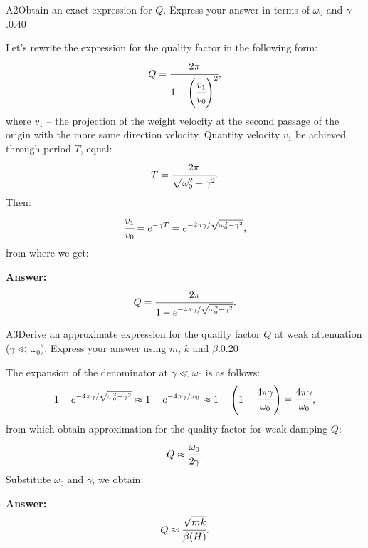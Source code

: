\documentclass[11pt,a4paper]{article}
\begin{document}
\begin{solcard}{A2}{Obtain an exact expression for $Q$. Express your answer in terms of $\omega_0$ and $\gamma$.}{0.40}

Let's rewrite the expression for the quality factor in the following form: $$Q=\cfrac{2\pi}{1-\left(\cfrac{v_1}{v_0}\right)^2}{,} $$where $v_1$ – the projection of the weight velocity at the second passage of the origin with the more same direction velocity. Quantity velocity $v_1$ be achieved through period $T$, equal: $$T=\cfrac{2\pi}{\sqrt{\omega^2_0-\gamma^2}}{.} $$Then: $$\cfrac{v_1}{v_0}=e^{-\gamma T}=e^{-2\pi\gamma/\sqrt{\omega^2_0-\gamma^2}}{,} $$from where we get:

\par\smallskip\noindent\textbf{Answer:} $$Q=\cfrac{2\pi}{1-e^{-4\pi\gamma/\sqrt{\omega^2_0-\gamma^2}}}{.} $$
\end{solcard}

\begin{solcard}{A3}{Derive an approximate expression for the quality factor $Q$ at weak attenuation ($\gamma\ll\omega_0$). Express your answer using $m$, $k$ and $\beta$.}{0.20}

The expansion of the denominator at $\gamma\ll{\omega_0}$ is as follows: $$1-e^{-4\pi\gamma/\sqrt{\omega^2_0-\gamma^2}}\approx 1-e^{-4\pi\gamma/\omega_0}\approx 1-\left(1-\cfrac{4\pi\gamma}{\omega_0}\right)=\cfrac{4\pi\gamma}{\omega_0}{,} $$from which obtain approximation for the quality factor for weak damping $Q$: $$Q\approx\cfrac{\omega_0}{2\gamma}{.} $$Substitute $\omega_0$ and $\gamma$, we obtain:

\par\smallskip\noindent\textbf{Answer:} $$Q\approx\cfrac{\sqrt{mk}}{\beta(H)}{.} $$
\end{solcard}
\end{document}
